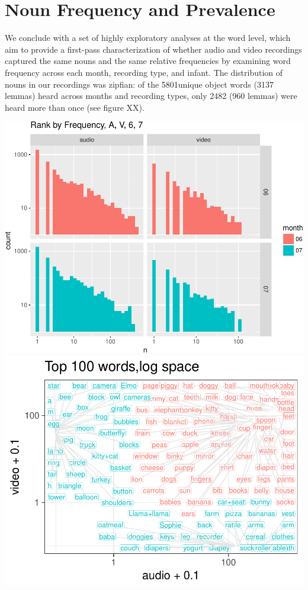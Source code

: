 \documentclass[man]{apa6}
\theoremstyle{definition}
\theoremstyle{definition}
\theoremstyle{definition}
\theoremstyle{remark}
\begin{document}
\section{Noun Frequency and
Prevalence}\label{noun-frequency-and-prevalence}

We conclude with a set of highly exploratory analyses at the word level,
which aim to provide a first-pass characterization of whether audio and
video recordings captured the same nouns and the same relative
frequencies by examining word frequency across each month, recording
type, and infant. The distribution of nouns in our recordings was
zipfian: of the 5801unique object words (3137 lemmas) heard across
months and recording types, only 2482 (960 lemmas) were heard more than
once (see figure XX).

\includegraphics{sixseven_papaja_files/figure-latex/noun_freq-1.pdf}
\includegraphics{sixseven_papaja_files/figure-latex/noun_freq-2.pdf}
\end{document}
